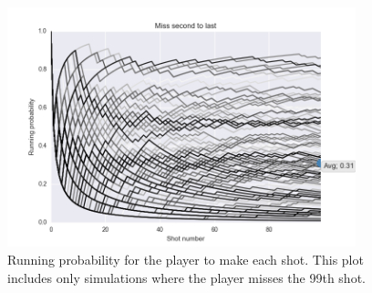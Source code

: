 \documentclass[12]{article}
\begin{document}
\begin{figure}
\begin{center}
  \includegraphics[width=0.9\textwidth]{figs/neurotic_basketball_player/miss_99.png}
\end{center}
\caption{Running probability for the player to make each shot. This plot
         includes only simulations where the player misses the 99th shot.}
\label{fig:}
\end{figure}
\end{document}
